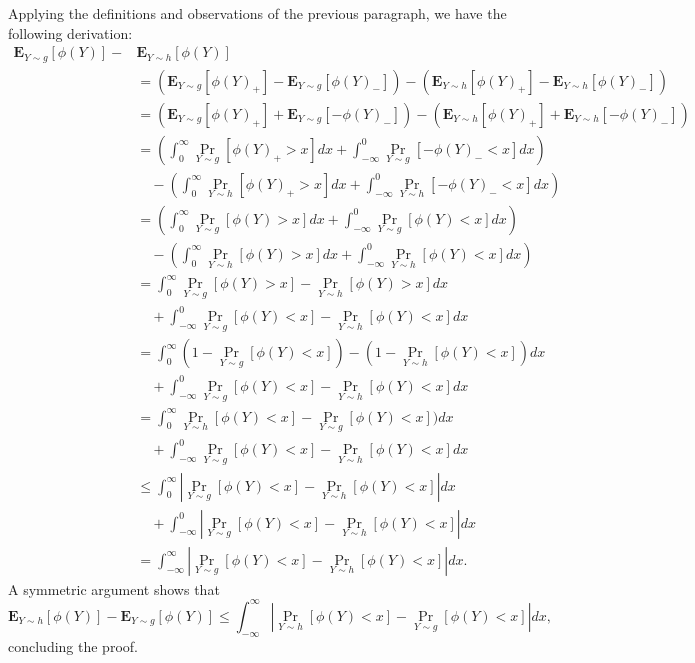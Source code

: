 \documentclass[final,12pt]{colt2018}
\newtheorem{informal theorem}[theorem]{Theorem (informal statement)}
\newcommand{\E}{\mathbf{E}}
\begin{document}
Applying the definitions and observations of the previous paragraph, we have the following derivation:
\begin{equation*}
\begin{split}
{\E}_{Y\sim g}[\phi(Y)] - & {\E}_{Y\sim h}[\phi(Y)] \\
&= \left( {\E}_{Y\sim g}[\phi(Y)_+] - {\E}_{Y\sim g}[\phi(Y)_-] \right) - \left( {\E}_{Y\sim h}[\phi(Y)_+] - {\E}_{Y\sim h}[\phi(Y)_-] \right) \\
&= \left( {\E}_{Y\sim g}[\phi(Y)_+] + {\E}_{Y\sim g}[-\phi(Y)_-] \right) - \left( {\E}_{Y\sim h}[\phi(Y)_+] + {\E}_{Y\sim h}[-\phi(Y)_-] \right) \\
&= \left( \int_{0}^{\infty} {\Pr}_{Y\sim g}[\phi(Y)_+ > x]dx + \int_{-\infty}^{0} {\Pr}_{Y\sim g}[-\phi(Y)_- < x]dx \right) \\ &\quad - \left( \int_{0}^{\infty} {\Pr}_{Y\sim h}[\phi(Y)_+ > x]dx + \int_{-\infty}^{0} {\Pr}_{Y\sim h}[-\phi(Y)_- < x]dx \right) \\
&= \left( \int_{0}^{\infty} {\Pr}_{Y\sim g}[\phi(Y) > x]dx + \int_{-\infty}^{0} {\Pr}_{Y\sim g}[\phi(Y) < x]dx \right) \\ &\quad - \left( \int_{0}^{\infty} {\Pr}_{Y\sim h}[\phi(Y) > x]dx + \int_{-\infty}^{0} {\Pr}_{Y\sim h}[\phi(Y) < x]dx \right) \\
&= \int_{0}^{\infty} {\Pr}_{Y\sim g}[\phi(Y) > x] - {\Pr}_{Y\sim h}[\phi(Y) > x] dx \\ &\quad + \int_{-\infty}^{0} {\Pr}_{Y\sim g}[\phi(Y) < x] - {\Pr}_{Y\sim h}[\phi(Y) < x] dx \\
&= \int_{0}^{\infty} (1 - {\Pr}_{Y\sim g}[\phi(Y) < x]) - (1 - {\Pr}_{Y\sim h}[\phi(Y) < x]) dx \\ &\quad + \int_{-\infty}^{0} {\Pr}_{Y\sim g}[\phi(Y) < x] - {\Pr}_{Y\sim h}[\phi(Y) < x] dx \\
&= \int_{0}^{\infty} {\Pr}_{Y\sim h}[\phi(Y) < x] - {\Pr}_{Y\sim g}[\phi(Y) < x]) dx \\ &\quad + \int_{-\infty}^{0} {\Pr}_{Y\sim g}[\phi(Y) < x] - {\Pr}_{Y\sim h}[\phi(Y) < x] dx \\
&\leq \int_{0}^{\infty} \left| {\Pr}_{Y\sim g}[\phi(Y) < x] - {\Pr}_{Y\sim h}[\phi(Y) < x] \right| dx \\ &\quad + \int_{-\infty}^{0} \left| {\Pr}_{Y\sim g}[\phi(Y) < x] - {\Pr}_{Y\sim h}[\phi(Y) < x] \right| dx \\
&= \int_{-\infty}^{\infty} \left| {\Pr}_{Y\sim g}[\phi(Y) < x] - {\Pr}_{Y\sim h}[\phi(Y) < x] \right| dx.
\end{split}
\end{equation*}
A symmetric argument shows that
\[
{\E}_{Y\sim h}[\phi(Y)] - {\E}_{Y\sim g}[\phi(Y)] \leq \int_{-\infty}^{\infty} \left| {\Pr}_{Y\sim h}[\phi(Y) < x] - {\Pr}_{Y\sim g}[\phi(Y) < x] \right| dx,
\]
concluding the proof.
\end{document}
